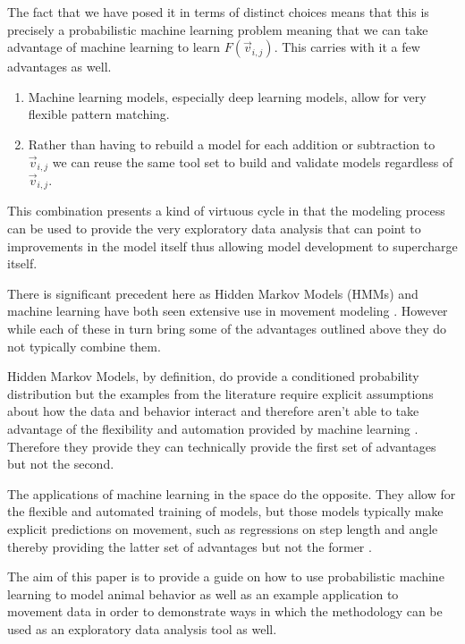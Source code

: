 \documentclass[11pt]{article}
\begin{document}
The fact that we have posed it in terms of distinct choices means that this is precisely a probabilistic machine learning problem \citep{durr} meaning that we can take advantage of machine learning to learn $F(\vec{v}_{i,j})$. This carries with it a few advantages as well. 

\begin{enumerate}
\item Machine learning models, especially deep learning models, allow for very flexible pattern matching.
\item Rather than having to rebuild a model for each addition or subtraction to $\vec{v}_{i,j}$ we can reuse the same tool set to build and validate models regardless of $\vec{v}_{i,j}$. 
\end{enumerate}

This combination presents a kind of virtuous cycle in that the modeling process can be used to provide the very exploratory data analysis that can point to improvements in the model itself thus allowing model development to supercharge itself. 

There is significant precedent here as Hidden Markov Models (HMMs) and machine learning have both seen extensive use in movement modeling \citep{mlmovement1}. However while each of these in turn bring some of the advantages outlined above they do not typically combine them. 

Hidden Markov Models, by definition, do provide a conditioned probability distribution but the examples from the literature require explicit assumptions about how the data and behavior interact and therefore aren't able to take advantage of the flexibility and automation provided by machine learning \citep{mlmovement1}. Therefore they provide they can technically provide the first set of advantages but not the second. 

The applications of machine learning in the space do the opposite. They allow for the flexible and automated training of models, but those models typically make explicit predictions on movement, such as regressions on step length and angle thereby providing the latter set of advantages but not the former \citep{mlmovement1}\citep{mlmovement2}\citep{mlmovement3}.  


The aim of this paper is to provide a guide on how to use probabilistic machine learning to model animal behavior as well as an example application to movement data in order to demonstrate ways in which the methodology can be used as an exploratory data analysis tool as well. 
\end{document}
